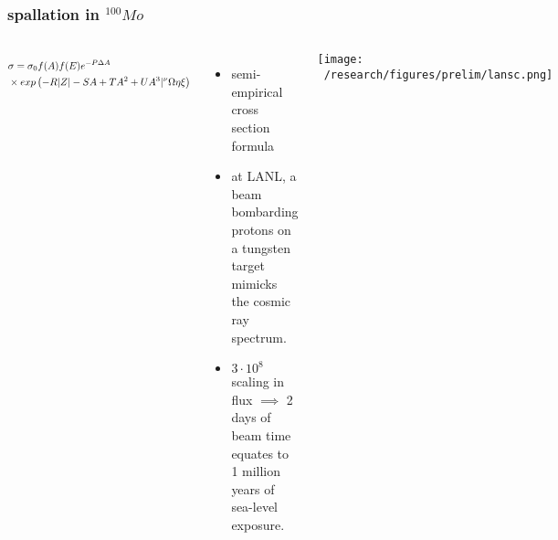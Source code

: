 \documentclass{beamer}
\begin{document}

	\begin{frame}
		\frametitle{spallation in $^{100}Mo$}
		\begin{columns}[c] %
			
			\begin{equation*}
			\resizebox{5cm}{!}{$
			\begin{split}
			& \sigma = \sigma_0 f(A)f(E)e^{-P\Delta A} \\
			& \times exp\left(-R|Z| -SA +TA^2 + UA^3|^{\nu} \Omega\eta\xi\right)
			\end{split}$}
			\end{equation*}
			
			\begin{itemize}
				\setlength\itemsep{2em}
				\item semi-empirical cross section formula
				\item at LANL, a beam bombarding protons on a tungsten target mimicks the cosmic ray spectrum.
				\item $3\cdot 10^8 $ scaling in flux $\implies$ 2 days of beam time equates to 1 million years of sea-level exposure.
			\end{itemize}
			
			\texttt{[image: ~/research/figures/prelim/lansc.png]}

			
		\end{columns}
	\end{frame}



%			
%			
	
\end{document}
